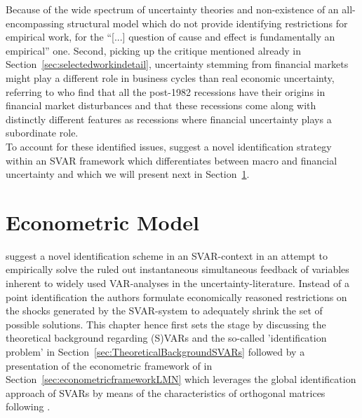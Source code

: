 \documentclass[a4paper,11pt,listof=nochaptergap,oneside,pointednumbers,bibtotoc,bigheadings,liststotoc,hidelinks]{scrbook}
\theoremstyle{mysatz}
\theoremstyle{mydefinition}
\theoremstyle{mytheorem}
\theoremstyle{mybemerkung}
\begin{document}
Because of the wide spectrum of uncertainty theories and non-existence of an all-encompassing structural model which do not provide identifying restrictions for empirical work, for \citet[p. 5]{ludvigsonetal:19} the ``[...] question of cause and effect is fundamentally an empirical'' one. Second, picking up the critique mentioned already in Section~\ref{sec:selectedworkindetail}, uncertainty stemming from financial markets might play a different role in business cycles than real economic uncertainty, referring to \citet{ngandwright:13} who find that all the post-1982 recessions have their origins in financial market disturbances and that these recessions come along with distinctly different features as recessions where financial uncertainty plays a subordinate role.\\

To account for these identified issues, \citet{ludvigsonetal:19} suggest a novel identification strategy within an SVAR framework which differentiates between macro and financial uncertainty and which we will present next in Section~\ref{EconometricModel}.




\chapter{Econometric Model}
\label{EconometricModel}
\citep{ludvigsonetal:18,ludvigsonetal:19} suggest a novel identification scheme in an SVAR-context in an attempt to empirically solve the ruled out instantaneous simultaneous feedback of variables inherent to widely used VAR-analyses in the uncertainty-literature. Instead of a point identification the authors formulate economically reasoned restrictions on the shocks generated by the SVAR-system to adequately shrink the set of possible solutions. This chapter hence first sets the stage by discussing the theoretical background regarding (S)VARs and the so-called 'identification problem' in Section~\ref{sec:TheoreticalBackgroundSVARs} followed by a presentation of the econometric framework of \citet{ludvigsonetal:19} in Section~\ref{sec:econometricframeworkLMN} which leverages the global identification approach of SVARs by means of the characteristics of orthogonal matrices following \citet{rubioetal:10}.
\end{document}
